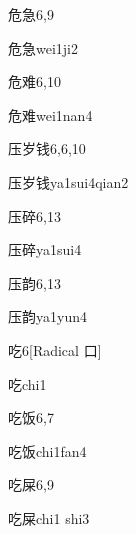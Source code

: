 \begin{entry}{危急}{6,9}
  \begin{phonetics}{危急}{wei1ji2}
  \end{phonetics}
\end{entry}

\begin{entry}{危难}{6,10}
  \begin{phonetics}{危难}{wei1nan4}
  \end{phonetics}
\end{entry}

\begin{entry}{压岁钱}{6,6,10}
  \begin{phonetics}{压岁钱}{ya1sui4qian2}
  \end{phonetics}
\end{entry}

\begin{entry}{压碎}{6,13}
  \begin{phonetics}{压碎}{ya1sui4}
  \end{phonetics}
\end{entry}

\begin{entry}{压韵}{6,13}
  \begin{phonetics}{压韵}{ya1yun4}
  \end{phonetics}
\end{entry}

\begin{entry}{吃}{6}[Radical ⼝]
  \begin{phonetics}{吃}{chi1}
  \end{phonetics}
\end{entry}

\begin{entry}{吃饭}{6,7}
  \begin{phonetics}{吃饭}{chi1fan4}
  \end{phonetics}
\end{entry}

\begin{entry}{吃屎}{6,9}
  \begin{phonetics}{吃屎}{chi1 shi3}
  \end{phonetics}
\end{entry}

